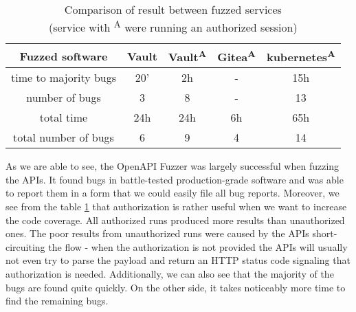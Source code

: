\paragraph{}
\begin{table}[h]
\begin{center}
\begin{tabular}{|c|c c c c|}
\hline
Fuzzed software & Vault & Vault\textsuperscript{A} & Gitea\textsuperscript{A} & kubernetes\textsuperscript{A} \\
\hline
time to majority bugs & 20' & 2h  & -  & 15h \\
number of bugs        & 3   & 8   & -  & 13  \\
\hline
total time            & 24h & 24h & 6h & 65h \\
total number of bugs  & 6   & 9   & 4  & 14  \\
\hline
\end{tabular}
\caption[Comparison of the result between fuzzed services]{Comparison of result between fuzzed services\\(service with \textsuperscript{A} were running an authorized session)}
\label{table:fuzzed-software}
\end{center}
\end{table}

As we are able to see, the OpenAPI Fuzzer was largely successful when fuzzing the APIs. It found bugs in battle-tested production-grade software and was able to report them in a form that we could easily file all bug reports. Moreover, we see from the table \ref{table:fuzzed-software} that authorization is rather useful when we want to increase the code coverage. All authorized runs produced more results than unauthorized ones. The poor results from unauthorized runs were caused by the APIs short-circuiting the flow - when the authorization is not provided the APIs will usually not even try to parse the payload and return an HTTP status code signaling that authorization is needed. Additionally, we can also see that the majority of the bugs are found quite quickly. On the other side, it takes noticeably more time to find the remaining bugs.
